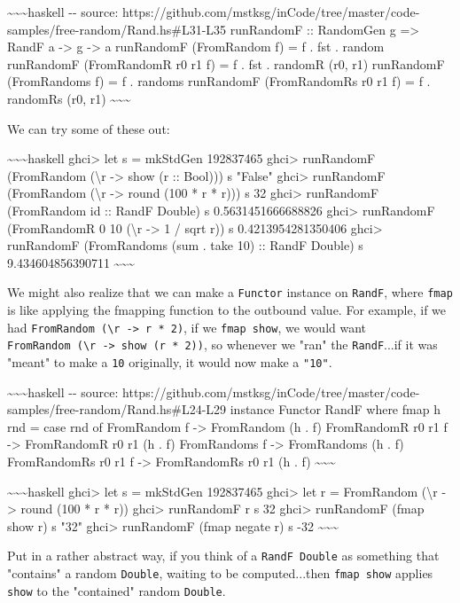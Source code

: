 \documentclass[]{article}
\begin{document}
\textasciitilde{}\textasciitilde{}\textasciitilde{}haskell -\/- source:
https://github.com/mstksg/inCode/tree/master/code-samples/free-random/Rand.hs\#L31-L35
runRandomF :: RandomGen g =\textgreater{} RandF a -\textgreater{} g
-\textgreater{} a runRandomF (FromRandom f) = f . fst . random runRandomF
(FromRandomR r0 r1 f) = f . fst . randomR (r0, r1) runRandomF (FromRandoms f) =
f . randoms runRandomF (FromRandomRs r0 r1 f) = f . randomRs (r0, r1)
\textasciitilde{}\textasciitilde{}\textasciitilde{}

We can try some of these out:

\textasciitilde{}\textasciitilde{}\textasciitilde{}haskell ghci\textgreater{}
let s = mkStdGen 192837465 ghci\textgreater{} runRandomF (FromRandom
(\textbackslash{}r -\textgreater{} show (r :: Bool))) s "False"
ghci\textgreater{} runRandomF (FromRandom (\textbackslash{}r -\textgreater{}
round (100 * r * r))) s 32 ghci\textgreater{} runRandomF (FromRandom id :: RandF
Double) s 0.5631451666688826 ghci\textgreater{} runRandomF (FromRandomR 0 10
(\textbackslash{}r -\textgreater{} 1 / sqrt r)) s 0.4213954281350406
ghci\textgreater{} runRandomF (FromRandoms (sum . take 10) :: RandF Double) s
9.434604856390711 \textasciitilde{}\textasciitilde{}\textasciitilde{}

We might also realize that we can make a \texttt{Functor} instance on
\texttt{RandF}, where \texttt{fmap} is like applying the fmapping function to
the outbound value. For example, if we had
\texttt{FromRandom\ (\textbackslash{}r\ -\textgreater{}\ r\ *\ 2)}, if we
\texttt{fmap\ show}, we would want
\texttt{FromRandom\ (\textbackslash{}r\ -\textgreater{}\ show\ (r\ *\ 2))}, so
whenever we "ran" the \texttt{RandF}...if it was "meant" to make a \texttt{10}
originally, it would now make a \texttt{"10"}.

\textasciitilde{}\textasciitilde{}\textasciitilde{}haskell -\/- source:
https://github.com/mstksg/inCode/tree/master/code-samples/free-random/Rand.hs\#L24-L29
instance Functor RandF where fmap h rnd = case rnd of FromRandom f
-\textgreater{} FromRandom (h . f) FromRandomR r0 r1 f -\textgreater{}
FromRandomR r0 r1 (h . f) FromRandoms f -\textgreater{} FromRandoms (h . f)
FromRandomRs r0 r1 f -\textgreater{} FromRandomRs r0 r1 (h . f)
\textasciitilde{}\textasciitilde{}\textasciitilde{}

\textasciitilde{}\textasciitilde{}\textasciitilde{}haskell ghci\textgreater{}
let s = mkStdGen 192837465 ghci\textgreater{} let r = FromRandom
(\textbackslash{}r -\textgreater{} round (100 * r * r)) ghci\textgreater{}
runRandomF r s 32 ghci\textgreater{} runRandomF (fmap show r) s "32"
ghci\textgreater{} runRandomF (fmap negate r) s -32
\textasciitilde{}\textasciitilde{}\textasciitilde{}

Put in a rather abstract way, if you think of a \texttt{RandF\ Double} as
something that "contains" a random \texttt{Double}, waiting to be
computed...then \texttt{fmap\ show} applies \texttt{show} to the "contained"
random \texttt{Double}.
\end{document}
